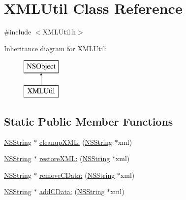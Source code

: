 \hypertarget{interface_x_m_l_util}{
\section{\-X\-M\-L\-Util \-Class \-Reference}
\label{interface_x_m_l_util}
}


{\ttfamily \#include $<$\-X\-M\-L\-Util.\-h$>$}

\-Inheritance diagram for \-X\-M\-L\-Util\-:\begin{figure}[H]
\begin{center}
\leavevmode
\includegraphics[height=2.000000cm]{interface_x_m_l_util}
\end{center}
\end{figure}
\subsection*{\-Static \-Public \-Member \-Functions}
\begin{DoxyCompactItemize}
\item 
\hyperlink{class_n_s_string}{\-N\-S\-String} $\ast$ \hyperlink{interface_x_m_l_util_a88dba1812e5f0ce546400e0ecdd4670d}{cleanup\-X\-M\-L\-:} (\hyperlink{class_n_s_string}{\-N\-S\-String} $\ast$xml)
\item 
\hyperlink{class_n_s_string}{\-N\-S\-String} $\ast$ \hyperlink{interface_x_m_l_util_ab7f4f06f02888af2281b9b98a8b103af}{restore\-X\-M\-L\-:} (\hyperlink{class_n_s_string}{\-N\-S\-String} $\ast$xml)
\item 
\hyperlink{class_n_s_string}{\-N\-S\-String} $\ast$ \hyperlink{interface_x_m_l_util_a86ae34669772064d33cefdb5131a9e3f}{remove\-C\-Data\-:} (\hyperlink{class_n_s_string}{\-N\-S\-String} $\ast$xml)
\item 
\hyperlink{class_n_s_string}{\-N\-S\-String} $\ast$ \hyperlink{interface_x_m_l_util_a18840ad3c92adedaf6cb9c9741c866ff}{add\-C\-Data\-:} (\hyperlink{class_n_s_string}{\-N\-S\-String} $\ast$xml)
\end{DoxyCompactItemize}


